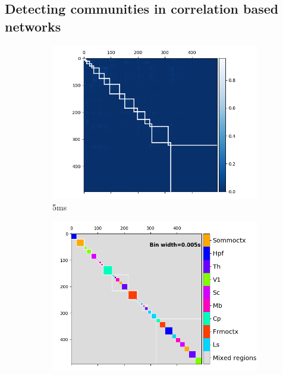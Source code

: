   \subsection{Detecting communities in correlation based networks}

  \begin{figure}
    \begin{subfigure}[h]{0.5\linewidth}
      \includegraphics[width=\linewidth]{figures/eight_probe/Krebs_0p005_rectified_cons_cluster_map.png}
      \caption{5ms}
      \label{fig:consensus_cluster_5ms}
    \end{subfigure}
    \begin{subfigure}[h]{0.5\linewidth}
      \includegraphics[width=\linewidth]{figures/eight_probe/Krebs_0p005_regional_cluster_map.png}

\end{subfigure}
\end{figure}
